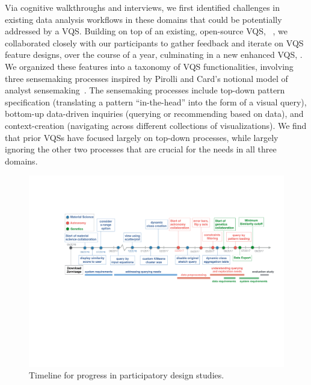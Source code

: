 \par Via cognitive walkthroughs and interviews, we first identified challenges in existing data analysis workflows in these domains
that could be potentially addressed by a VQS. Building on top of an existing, open-source VQS, \zv~\cite{Siddiqui2017,Siddiqui2017VLDB}, we collaborated closely with our participants to gather feedback and iterate on VQS feature designs,
over the course of a year, culminating in a new enhanced VQS, \zvpp. We organized these features into a taxonomy of VQS functionalities, involving three sensemaking processes inspired by Pirolli and Card's notional model of analyst sensemaking~\cite{Pirolli}. The sensemaking processes include top-down pattern specification (translating a pattern ``in-the-head'' into the form of a visual query), bottom-up data-driven inquiries (querying or recommending based on data), and context-creation (navigating across different collections of visualizations). We find that prior VQSs have focused largely on top-down processes, while largely ignoring the other two processes that are crucial for the needs in all three domains.

\begin{figure}[ht!]
	\centering
	\captionsetup{justification=centering,margin=2cm}
	\vspace{-10pt}
	\includegraphics[width=6in]{figures/timeline_anon.pdf}
	\vspace{-6pt}\caption{Timeline for progress in participatory design studies.}
	\label{timeline}
	\vspace{-10pt}
\end{figure}

